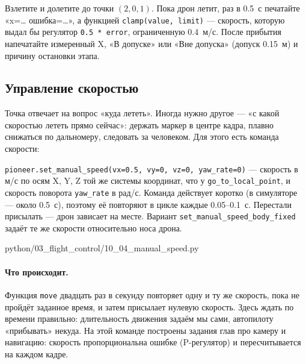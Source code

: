 \begin{taskbox}
Взлетите и долетите до точки $(2, 0, 1)$. Пока дрон летит, раз в 0.5~с печатайте «x=\ldots{} ошибка=\ldots», а функцией \verb|clamp(value, limit)| --- скорость, которую выдал бы регулятор \verb|0.5 * error|, ограниченную 0.4~м/с. После прибытия напечатайте измеренный X, «В допуске» или «Вне допуска» (допуск 0.15~м) и причину остановки этапа.
\end{taskbox}

\subsection{Управление скоростью}
\label{sec:python-manual-speed}

Точка отвечает на вопрос «куда лететь». Иногда нужно другое --- «с какой скоростью лететь прямо сейчас»: держать маркер в центре кадра, плавно снижаться по дальномеру, следовать за человеком. Для этого есть команда скорости:

\begin{codebox}
\verb|pioneer.set_manual_speed(vx=0.5, vy=0, vz=0, yaw_rate=0)| --- скорость в м/с по осям X, Y, Z той же системы координат, что у \verb|go_to_local_point|, и скорость поворота \verb|yaw_rate| в рад/с. Команда действует коротко (в симуляторе --- около 0.5~с), поэтому её повторяют в цикле каждые 0.05--0.1~с. Перестали присылать --- дрон зависает на месте. Вариант \verb|set_manual_speed_body_fixed| задаёт те же скорости относительно носа дрона.
\end{codebox}

\begin{codefile}[python]{python/03_flight_control/10_04_manual_speed.py}
\end{codefile}

\paragraph{Что происходит.} Функция \verb|move| двадцать раз в секунду повторяет одну и ту же скорость, пока не пройдёт заданное время, и затем присылает нулевую скорость. Здесь ждать по времени правильно: длительность движения задаём мы сами, автопилоту «прибывать» некуда. На этой команде построены задания глав про камеру и навигацию: скорость пропорциональна ошибке (P-регулятор) и пересчитывается на каждом кадре.

